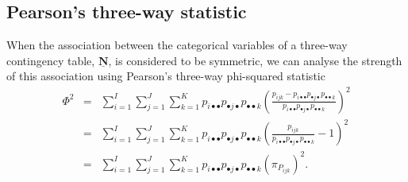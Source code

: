 \subsection{Pearson's three-way statistic}

When the association between the categorical variables of a three-way contingency table, $\mathbf{\underline{N}}$, is considered to be symmetric, we can analyse the strength of this association using  Pearson's three-way phi-squared statistic 
\begin{eqnarray}
\label{phi}
\Phi^2 & = &\sum_{i=1}^I\sum_{j=1}^J\sum_{k=1}^K p_{i \bullet \bullet }p_{\bullet j\bullet }p_{\bullet \bullet k}\left ( \frac{p_{ijk }-p_{i\bullet \bullet }p_{\bullet j\bullet }p_{\bullet \bullet k}}{p_{i \bullet \bullet }p_{\bullet j\bullet }p_{\bullet \bullet k}} \right )^2\\
& = & \sum_{i=1}^I\sum_{j=1}^J\sum_{k=1}^K p_{i \bullet \bullet }p_{\bullet j\bullet }p_{\bullet \bullet k}\left( \frac{p_{ijk}} {p_{i \bullet \bullet }p_{\bullet j\bullet }p_{\bullet \bullet k}} -1 \right)^2  \nonumber \\
& = &\sum_{i=1}^I\sum_{j=1}^J\sum_{k=1}^K p_{i \bullet \bullet }p_{\bullet j\bullet }p_{\bullet \bullet k} \left(\pi_{P_{ijk}}\right)^2 . \nonumber
\end{eqnarray}

